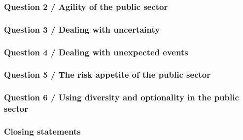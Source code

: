 \subsubsection{Question 2 / Agility of the public sector}

\subsubsection{Question 3 / Dealing with uncertainty}

\subsubsection{Question 4 / Dealing with unexpected events}

\subsubsection{Question 5 / The risk appetite of the public sector}

\subsubsection{Question 6 / Using diversity and optionality in the public sector}

\subsubsection{Closing statements}